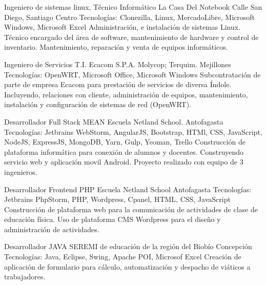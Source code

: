 \documentclass[draft,color,12pt,letterpaper,sans]{moderncv}
\begin{document}
{Ingeniero de sistemas linux, T\'ecnico Inform\'atico}
{La Casa Del Notebook}
{Calle San Diego, Santiago Centro}
{\newline Tecnolog\'ias: Clonezilla, Linux, MercadoLibre, Microsoft Windows, Microsoft Excel}
{Administraci\'on, e instalaci\'on de sistemas Linux. T\'ecnico encargado del \'area de software, mantenimiento de hardware y control de inventario. Mantenimiento, reparaci\'on y venta de equipos inform\'aticos.\newline} 

{Ingeniero de Servicios T.I.}
{Ecacom S.P.A.}
{Molycop; Terquim. Mejillones}
{\newline Tecnolog\'ias: OpenWRT, Microsoft Office, Microsoft Windows}
{Subcontrataci\'on de parte de empresa Ecacom para prestaci\'on de servicios de diversa \'Indole. Incluyendo, relaciones con cliente, administraci\'on de equipos, mantenimiento, instalaci\'on y configuraci\'on de sistemas de red (OpenWRT).\newline}

{Desarrollador Full Stack MEAN}
{Escuela Netland School.}
{Antofagasta}
{\newline Tecnolog\'ias: Jetbrains WebStorm, AngularJS, Bootstrap, HTMl, CSS, JavaScript, NodeJS, ExpressJS, MongoDB, Yarn, Gulp, Yeoman, Trello}
{Construcci\'on de plataforma inform\'atica para conexi\'on de alumnos y docentes. Construyendo servicio web y aplicaci\'on movil Android. Proyecto realizado con equipo de 3 ingenieros. \newline}

{Desarrollador Frontend PHP}
{Escuela Netland School}
{Antofagasta}
{\newline Tecnolog\'ias: Jetbrains PhpStorm, PHP, Wordpress, Cpanel, HTML, CSS, JavaScript}
{Construcci\'on de plataforma web para la comunicaci\'on de actividades de clase de educaci\'on f\'isica. Uso de plataforma CMS Wordpress para el dise\~no y administraci\'on de actividades.\newline}

{Desarrollador JAVA}
{SEREMI de educación de la región del Biobío}
{Concepci\'on}
{\newline Tecnolog\'ias: Java, Eclipse, Swing, Apache POI, Microsof Excel}
{Creaci\'on de aplicaci\'on de formulario para c\'alculo, automatizaci\'on y despacho de vi\'aticos a trabajadores.\newline}
\end{document}
